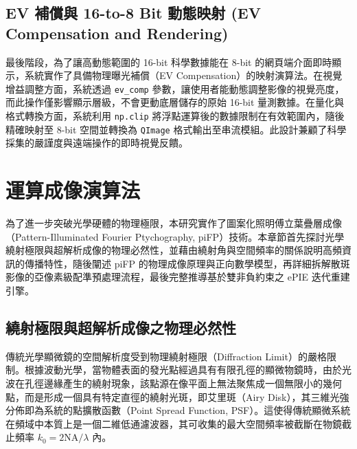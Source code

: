 \subsection{EV 補償與 16-to-8 Bit 動態映射 (EV Compensation and Rendering)}

最後階段，為了讓高動態範圍的 16-bit 科學數據能在 8-bit 的網頁端介面即時顯示，系統實作了具備物理曝光補償（EV Compensation）的映射演算法。在視覺增益調整方面，系統透過 \texttt{ev\_comp} 參數，讓使用者能動態調整影像的視覺亮度，而此操作僅影響顯示層級，不會更動底層儲存的原始 16-bit 量測數據。在量化與格式轉換方面，系統利用 \texttt{np.clip} 將浮點運算後的數據限制在有效範圍內，隨後精確映射至 8-bit 空間並轉換為 \texttt{QImage} 格式輸出至串流模組。此設計兼顧了科學採集的嚴謹度與遠端操作的即時視覺反饋。



\section{運算成像演算法}

為了進一步突破光學硬體的物理極限，本研究實作了圖案化照明傅立葉疊層成像（Pattern-Illuminated Fourier Ptychography, piFP）技術。本章節首先探討光學繞射極限與超解析成像的物理必然性，並藉由繞射角與空間頻率的關係說明高頻資訊的傳播特性，隨後闡述 piFP 的物理成像原理與正向數學模型，再詳細拆解散斑影像的亞像素級配準預處理流程，最後完整推導基於雙非負約束之 ePIE 迭代重建引擎。

\subsection{繞射極限與超解析成像之物理必然性}

傳統光學顯微鏡的空間解析度受到物理繞射極限（Diffraction Limit）的嚴格限制。根據波動光學，當物體表面的發光點經過具有有限孔徑的顯微物鏡時，由於光波在孔徑邊緣產生的繞射現象，該點源在像平面上無法聚焦成一個無限小的幾何點，而是形成一個具有特定直徑的繞射光斑，即艾里斑（Airy Disk），其三維光強分佈即為系統的點擴散函數（Point Spread Function, PSF）。這使得傳統顯微系統在頻域中本質上是一個二維低通濾波器，其可收集的最大空間頻率被截斷在物鏡截止頻率 $k_0 = 2\text{NA}/\lambda$ 內。

